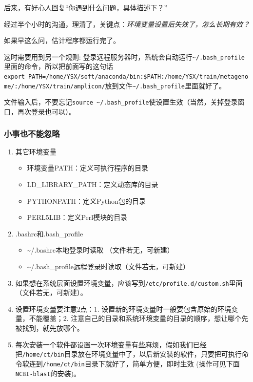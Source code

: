 \documentclass[]{article}
\providecommand{\tightlist}{%
  \setlength{\itemsep}{0pt}\setlength{\parskip}{0pt}}
\numberwithin{figure}{section}
\numberwithin{table}{section}
\begin{document}
后来，有好心人回复``你遇到什么问题，具体描述下？''

经过半个小时的沟通，理清了，关键点：\emph{环境变量设置后失效了，怎么长期有效？}

如果早这么问，估计程序都运行完了。

这时需要用到另一个规则: 登录远程服务器时，系统会自动运行\texttt{\textasciitilde{}/.bash\_profile}里面的命令，所以把前面写的这句话\texttt{export\ PATH=/home/YSX/soft/anaconda/bin:\$PATH:/home/YSX/train/metagenome/:/home/YSX/train/amplicon/}放到文件\texttt{\textasciitilde{}/.bash\_profile}里面就好了。

文件输入后，不要忘记\texttt{source\ \textasciitilde{}/.bash\_profile}使设置生效（当然，关掉登录窗口，再次登录也可以）。

\hypertarget{last_but_not_least}{%
\subsubsection{小事也不能忽略}\label{last_but_not_least}}

\begin{enumerate}
\def\labelenumi{\arabic{enumi}.}
\setcounter{enumi}{1}
\tightlist
\item
  其它环境变量

  \begin{itemize}
  \tightlist
  \item
    环境变量PATH：定义可执行程序的目录
  \item
    LD\_LIBRARY\_PATH：定义动态库的目录
  \item
    PYTHONPATH：定义Python包的目录
  \item
    PERL5LIB：定义Perl模块的目录
  \end{itemize}
\item
  .bashrc和.bash\_profile

  \begin{itemize}
  \tightlist
  \item
    \textasciitilde/.bashrc本地登录时读取 （文件若无，可新建）
  \item
    \textasciitilde/.bash\_profile远程登录时读取（文件若无，可新建）
  \end{itemize}
\item
  如果想在系统层面设置环境变量，应该写到\texttt{/etc/profile.d/custom.sh}里面（文件若无，可新建）。
\item
  设置环境变量要注意2点：1. 设置新的环境变量时一般要包含原始的环境变量，不能覆盖；2. 注意自己的目录和系统环境变量的目录的顺序，想让哪个先被找到，就先放哪个。
\item
  每次安装一个软件都设置一次环境变量有些麻烦，假如我们已经把\texttt{/home/ct/bin}目录放在环境变量中了，以后新安装的软件，只要把可执行命令软连到\texttt{/home/ct/bin}目录下就好了，简单方便，即时生效 (操作可见下面\texttt{NCBI-blast}的安装)。
\end{enumerate}
\end{document}
